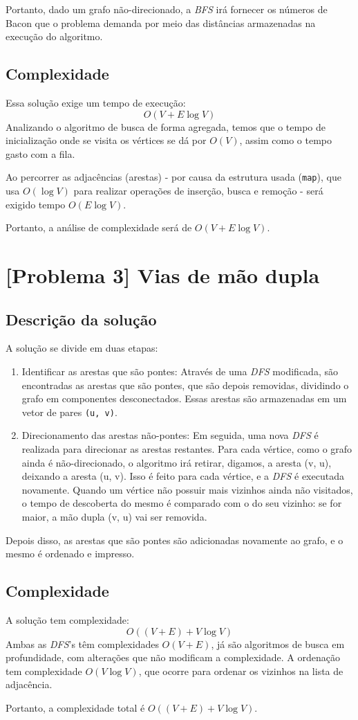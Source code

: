 \documentclass[12pt, letterpaper]{article}
\begin{document}
            Portanto, dado um grafo não-direcionado, a \emph{BFS} irá fornecer os números de Bacon que o problema demanda por meio das distâncias armazenadas na execução do algoritmo.

        \subsection{Complexidade}
            Essa solução exige um tempo de execução:
            $$ O(V + E\log{V}) $$
            Analizando o algoritmo de busca de forma agregada, temos que o tempo de inicialização onde se visita os vértices se dá por $O(V)$, assim como o tempo gasto com a fila.

            Ao percorrer as adjacências (arestas) - por causa da estrutura usada (\verb|map|), que usa $O(\log{V})$ para realizar operações de inserção, busca e remoção - será exigido tempo $O(E\log{V})$.

            Portanto, a análise de complexidade será de $O(V + E\log{V})$.
    \section{[Problema 3] Vias de mão dupla}
        \subsection{Descrição da solução}
            A solução se divide em duas etapas:
            \begin{enumerate}
                \item Identificar as arestas que são pontes:
                    Através de uma \emph{DFS} modificada, são encontradas as arestas que são pontes, que são depois removidas, dividindo o grafo em componentes desconectados. Essas arestas são armazenadas em um vetor de pares \verb|(u, v)|.
                \item Direcionamento das arestas não-pontes:
                    Em seguida, uma nova \emph{DFS} é realizada para direcionar as arestas restantes. Para cada vértice, como o grafo ainda é não-direcionado, o algoritmo irá retirar, digamos, a aresta (v, u), deixando a aresta (u, v). Isso é feito para cada vértice, e a \emph{DFS} é executada novamente.
                    Quando um vértice não possuir mais vizinhos ainda não visitados, o tempo de descoberta do mesmo é comparado com o do seu vizinho: se for maior, a mão dupla (v, u) vai ser removida.
            \end{enumerate}
            Depois disso, as arestas que são pontes são adicionadas novamente ao grafo, e o mesmo é ordenado e impresso.

        \subsection{Complexidade}
            A solução tem complexidade:
            $$ O((V + E) + V\log{V}) $$
            Ambas as \emph{DFS}'s têm complexidades $O(V + E)$, já são algoritmos de busca em profundidade, com alterações que não modificam a complexidade. A ordenação tem complexidade $O(V\log{V})$, que ocorre para ordenar os vizinhos na lista de adjacência.

            Portanto, a complexidade total é $O((V + E) + V\log{V})$.
\end{document}
